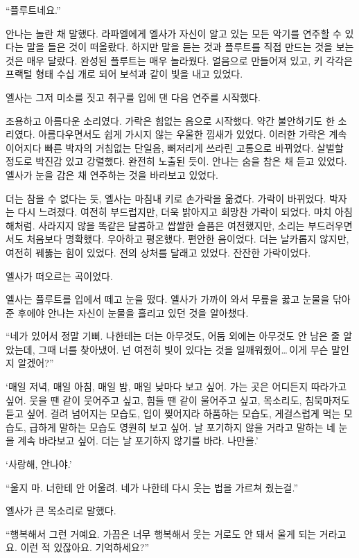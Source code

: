 ``플루트네요.''

안나는 놀란 채 말했다. 라파엘에게 엘사가 자신이 알고 있는 모든 악기를 연주할 수 있다는 말을 들은 것이 떠올랐다. 하지만 말을 듣는 것과 플루트를 직접 만드는 것을 보는 것은 매우 달랐다. 완성된 플루트는 매우 놀라웠다. 얼음으로 만들어져 있고, 키 각각은 프랙털 형태 수십 개로 되어 보석과 같이 빛을 내고 있었다.

엘사는 그저 미소를 짓고 취구를 입에 댄 다음 연주를 시작했다.

조용하고 아름다운 소리였다. 가락은 힘없는 음으로 시작했다. 약간 불안하기도 한 소리였다. 아름다우면서도 쉽게 가시지 않는 우울한 낌새가 있었다. 이러한 가락은 계속 이어지다 빠른 박자의 거침없는 단일음, 뼈저리게 쓰라린 고통으로 바뀌었다. 살벌할 정도로 박진감 있고 강렬했다. 완전히 노출된 듯이. 안나는 숨을 참은 채 듣고 있었다. 엘사가 눈을 감은 채 연주하는 것을 바라보고 있었다.

더는 참을 수 없다는 듯, 엘사는 마침내 키로 손가락을 옮겼다. 가락이 바뀌었다. 박자는 다시 느려졌다. 여전히 부드럽지만, 더욱 밝아지고 희망찬 가락이 되었다. 마치 아침 해처럼. 사라지지 않을 똑같은 달콤하고 쌉쌀한 슬픔은 여전했지만, 소리는 부드러우면서도 처음보다 명확했다. 우아하고 평온했다. 편안한 음이었다. 더는 날카롭지 않지만, 여전히 꿰뚫는 힘이 있었다. 전의 상처를 달래고 있었다. 잔잔한 가락이었다.

엘사가 떠오르는 곡이었다.

엘사는 플루트를 입에서 떼고 눈을 떴다. 엘사가 가까이 와서 무릎을 꿇고 눈물을 닦아준 후에야 안나는 자신이 눈물을 흘리고 있던 것을 알아챘다.

``네가 있어서 정말 기뻐. 나한테는 더는 아무것도, 어둠 외에는 아무것도 안 남은 줄 알았는데, 그때 너를 찾아냈어. 넌 여전히 빛이 있다는 것을 일깨워줬어\ldots\,이게 무슨 말인지 알겠어?''

`매일 저녁, 매일 아침, 매일 밤, 매일 낮마다 보고 싶어. 가는 곳은 어디든지 따라가고 싶어. 웃을 땐 같이 웃어주고 싶고, 힘들 땐 같이 울어주고 싶고, 목소리도, 침묵마저도 듣고 싶어. 걸려 넘어지는 모습도, 입이 찢어지라 하품하는 모습도, 게걸스럽게 먹는 모습도, 급하게 말하는 모습도 영원히 보고 싶어. 날 포기하지 않을 거라고 말하는 네 눈을 계속 바라보고 싶어. 더는 날 포기하지 않기를 바라. 나만을.'

`사랑해, 안나야.'

``울지 마. 너한테 안 어울려. 네가 나한테 다시 웃는 법을 가르쳐 줬는걸.''

엘사가 큰 목소리로 말했다.

``행복해서 그런 거예요. 가끔은 너무 행복해서 웃는 거로도 안 돼서 울게 되는 거라고요. 이런 적 있잖아요. 기억하세요?''

